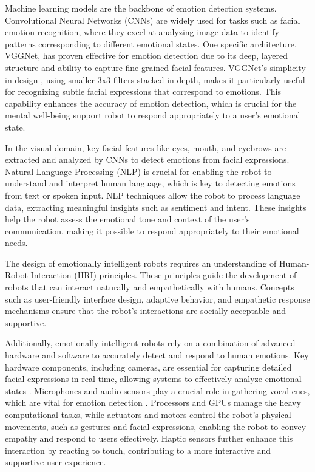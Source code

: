 Machine learning models are the backbone of emotion detection systems. Convolutional Neural Networks (CNNs) \cite{computation11030052} are widely used for tasks such as facial emotion recognition, where they excel at analyzing image data to identify patterns corresponding to different emotional states. One specific architecture, VGGNet, has proven effective for emotion detection due to its deep, layered structure and ability to capture fine-grained facial features. VGGNet's simplicity in design \cite{computation11030052}, using smaller 3x3 filters stacked in depth, makes it particularly useful for recognizing subtle facial expressions that correspond to emotions. This capability enhances the accuracy of emotion detection, which is crucial for the mental well-being support robot to respond appropriately to a user's emotional state.

In the visual domain, key facial features like eyes, mouth, and eyebrows are extracted and analyzed by
CNNs to detect emotions from facial expressions. Natural Language Processing (NLP) is crucial for enabling the robot to understand and interpret human language, which is key to detecting emotions from text or spoken input. NLP techniques allow the robot to process language data, extracting meaningful insights such as sentiment and intent. These insights help the robot assess the emotional tone and context of the user’s communication, making it possible to respond appropriately to their emotional needs.

The design of emotionally intelligent robots requires an understanding of Human-Robot Interaction
(HRI) principles. These principles guide the development of robots that can interact naturally and
empathetically with humans. Concepts such as user-friendly interface design, adaptive behavior, and empathetic response mechanisms ensure that the robot’s interactions are socially acceptable and supportive.

Additionally, emotionally intelligent robots rely on a combination of advanced hardware and software
to accurately detect and respond to human emotions. Key hardware components, including cameras,
are essential for capturing detailed facial expressions in real-time, allowing systems to effectively analyze
emotional states \cite{gupta-2024}. Microphones and audio sensors play a crucial role in gathering vocal cues, which
are vital for emotion detection \cite{10.48175/ijarsct-15385}. Processors and GPUs manage the heavy computational tasks, while
actuators and motors control the robot’s physical movements, such as gestures and facial expressions,
enabling the robot to convey empathy and respond to users effectively. Haptic sensors further enhance
this interaction by reacting to touch, contributing to a more interactive and supportive user experience.

